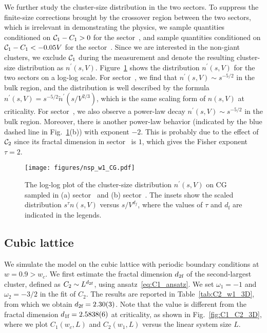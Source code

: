 We further study the cluster-size distribution in the two sectors. To suppress the finite-size corrections brought by
the crossover region between the two sectors, which is irrelevant in demonstrating the physics, we sample quantities conditioned on 
${\mathcal C}_1 - C_1 > 0$ for the sector~, and sample quantities conditioned on ${\mathcal C}_1 - C_1 < -0.05V$ for the sector~.
Since we are interested in the non-giant clusters, we exclude ${\mathcal C}_1$ during the measurement and denote the resulting
cluster-size distribution as $n^\prime(s, V)$. Figure~\ref{fig:nsp_w1_CG} shows the distribution $n^\prime(s, V)$ for the two sectors on a log-log scale.
For sector~, we find that $n^{\prime}(s, V)\sim s^{-5/2}$ in the bulk region, and the distribution is well described by the formula $n^\prime(s, V) = s^{-5/2} \tilde{n}^\prime(s/V^{2/3})$, 
which is the same scaling form of $n(s, V)$ at criticality. For sector~, we also observe a power-law decay $n^\prime(s, V)\sim s^{-5/2}$ in the bulk
region. Moreover, there is another power-law behavior (indicated by the blue dashed line in Fig.~\ref{fig:nsp_w1_CG}(b)) with exponent $-2$.
This is probably due to the effect of ${\mathcal C}_2$ since its fractal dimension in sector~ is $1$, which gives the Fisher exponent $\tau = 2$.

\begin{figure}[tb]
	\centering
	\texttt{[image: figures/nsp\_w1\_CG.pdf]}
	\caption{The log-log plot of the cluster-size distribution $n^\prime(s, V)$ on CG sampled in (a) sector~ and (b) sector~. The insets show
	the scaled distribution $s^\tau n(s, V)$ versus $s/V^{d_f}$, where the values of $\tau$ and $d_\text{f}$ are indicated in the legends.}
	\label{fig:nsp_w1_CG}
\end{figure}

\subsection{Cubic lattice}
We simulate the model on the cubic lattice with periodic boundary conditions at $w = 0.9  > w_c$. 
We first estimate the fractal dimension ${d_{2\textrm{f}}}$ of the second-largest cluster, defined as $C_2 \sim L^{{d_{2\textrm{f}}}}$, using ansatz~\eqref{eq:C1_ansatz}.
We set $\omega_1 = -1$ and $\omega_2 = -3/2$ in the fit of $C_2$. The results are reported in Table~\ref{tab:C2_w1_3D}, from which we
obtain ${d_{2\textrm{f}}} = 2.30(3)$. Note that the value is different from the fractal dimension ${d_{1\textrm{f}}} = 2.5838(6)$ at criticality,
as shown in Fig.~\ref{fig:C1_C2_3D}, where we plot $C_1(w_c, L)$ and $C_2(w_1, L)$ versus the linear system size $L$. 


